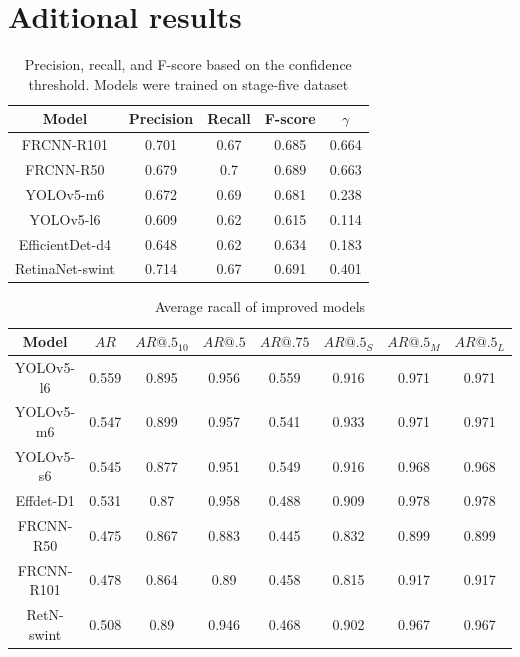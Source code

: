\appendix



\chapter{Aditional results}

\begin{table}[H]
    \begin{tabular}{|c|c|c|c|c|}
        \hline
        Model           & Precision & Recall & F-score & $\gamma$ \\ \hline
        FRCNN-R101      & 0.701     & 0.67   & 0.685   & 0.664    \\ \hline
        FRCNN-R50       & 0.679     & 0.7    & 0.689   & 0.663    \\ \hline
        YOLOv5-m6       & 0.672     & 0.69   & 0.681   & 0.238    \\ \hline
        YOLOv5-l6       & 0.609     & 0.62   & 0.615   & 0.114    \\ \hline
        EfficientDet-d4 & 0.648     & 0.62   & 0.634   & 0.183    \\ \hline
        RetinaNet-swint & 0.714     & 0.67   & 0.691   & 0.401    \\ \hline
    \end{tabular}
    \caption{Precision, recall, and F-score based on the confidence threshold. Models were trained on stage-five dataset}
    \label{tab:model_prf:stage_five}
\end{table}


\begin{table}[H]
    \centering
    \begin{tabular}{|c|c|c|c|c|c|c|c|}
        \hline
        Model      & $AR$  & $AR@.5_{10}$ & $AR@.5$ & $AR@.75$ & $AR@.5_S$ & $AR@.5_M$ & $AR@.5_L$ \\ \hline
        YOLOv5-l6  & 0.559 & 0.895        & 0.956   & 0.559    & 0.916     & 0.971     & 0.971     \\ \hline
        YOLOv5-m6  & 0.547 & 0.899        & 0.957   & 0.541    & 0.933     & 0.971     & 0.971     \\ \hline
        YOLOv5-s6  & 0.545 & 0.877        & 0.951   & 0.549    & 0.916     & 0.968     & 0.968     \\ \hline
        Effdet-D1  & 0.531 & 0.87         & 0.958   & 0.488    & 0.909     & 0.978     & 0.978     \\ \hline
        FRCNN-R50  & 0.475 & 0.867        & 0.883   & 0.445    & 0.832     & 0.899     & 0.899     \\ \hline
        FRCNN-R101 & 0.478 & 0.864        & 0.89    & 0.458    & 0.815     & 0.917     & 0.917     \\ \hline
        RetN-swint & 0.508 & 0.89         & 0.946   & 0.468    & 0.902     & 0.967     & 0.967     \\ \hline
    \end{tabular}
    \caption{Average racall of improved models}
    \label{tab:improved:recall}
\end{table}


